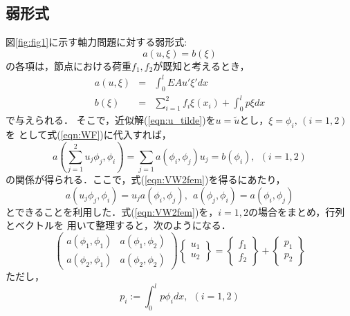 \documentclass[10pt,a4j]{jarticle}
\begin{document}
\subsection{弱形式}
図\ref{fig:fig1}に示す軸力問題に対する弱形式:
\begin{equation}
	a(u,\xi)=b(\xi)
	\label{eqn:WF}
\end{equation}
の各項は，節点における荷重$f_1,f_2$が既知と考えるとき，
\begin{eqnarray}
	a(u,\xi) &= & \int_{0}^{l}EAu'\xi'dx 
	\label{eqn:def_a}
	\\
	b(\xi) &= & \sum_{i=1}^2 f_i\xi(x_i) + \int_{0}^{l}p\xi dx
	\label{eqn:def_b}
\end{eqnarray}
で与えられる．
そこで，近似解(\ref{eqn:u_tilde})を$u=\tilde u$とし，$\xi=\phi_i,\,(i=1,2)$を
として式(\ref{eqn:WF})に代入すれば，
\begin{equation}
	a\left(\sum_{j=1}^2u_j\phi_j, \phi_i \right)
	=
	\sum_{j=1}  a\left( \phi_i, \phi_j \right)u_j=b(\phi_i), \ \ (i=1,2)
	\label{eqn:VW2fem}
\end{equation}
の関係が得られる．ここで，式(\ref{eqn:VW2fem})を得るにあたり，
\begin{equation}
	a(u_j\phi_j,\phi_i)=u_ja(\phi_i,\phi_j), \ \ a(\phi_j,\phi_i)=a(\phi_i,\phi_j)
\end{equation}
とできることを利用した．式(\ref{eqn:VW2fem})を，$i=1,2$の場合をまとめ，行列とベクトルを
用いて整理すると，次のようになる．
\begin{equation}
	\left(
	\begin{array}{cc}
		a(\phi_1,\phi_1) & a(\phi_1,\phi_2)  \\
		a(\phi_2,\phi_1) & a(\phi_2,\phi_2)  
	\end{array}
	\right)
	\left\{
	\begin{array}{c}
		u_1 \\
		u_2
	\end{array}
	\right\}
	=
	\left\{
	\begin{array}{c}
		f_1 \\
		f_2 
	\end{array}
	\right\}
	+
	\left\{
	\begin{array}{c}
		p_1 \\
		p_2
	\end{array}
	\right\}
	\label{eqn:fem_n1}
\end{equation}
ただし，
\begin{equation}
	p_i:=\int_{0}^{l} p \phi_i dx, \ \ (i=1,2)
	\label{eqn:def_pi}
\end{equation}
\end{document}
